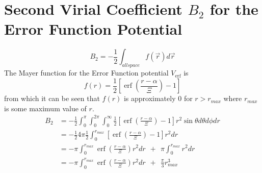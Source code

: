 \documentclass[double,12pt]{beavtex}
\begin{document}
\section{Second Virial Coefficient $B_{2}$ for the Error Function Potential}
\begin{equation}B_2=-\frac{1}{2}\int_{allspace}f(\vec{r})d\vec r\end{equation}
The Mayer function for the Error Function potential $V_{\operatorname{erf}}$ is
\begin{equation}f(r)=\frac{1}{2}\left[\operatorname{erf}\left(\frac{r-\alpha}{\Xi}\right)-1\right]\end{equation} 
from which it can be seen that $f(r)$ is approximately 0 for $r>r_{max}$ 
where $r_{max}$ is some maximum value of $r$.
\begin{align}
 B_2 &= -\frac{1}{2}\int_0^{\pi}\int_0^{2\pi}\int_0^\infty\frac{1}{2}\left[\operatorname{erf}\left(\frac{r-\alpha}{\Xi}\right)-1\right]r^2\sin{\theta}d{\theta}d{\phi}dr \nonumber  \\
     &= -\frac{1}{2}4\pi\frac{1}{2}\int_{0}^{r_{max}}\left[\operatorname{erf}\left(\frac{r-\alpha}{\Xi}\right)-1\right]r^2dr \nonumber  \\
     &= -\pi\int_{0}^{r_{max}}\operatorname{erf}\left(\frac{r-\alpha}{\Xi}\right)r^2dr {~~}+{~~} \pi\int_0^{r_{max}}r^2dr  \nonumber  \\
     &= -\pi\int_{0}^{r_{max}}\operatorname{erf}\left(\frac{r-\alpha}{\Xi}\right)r^2dr {~~}+{~~} \frac{\pi}{3}r_{max}^3   
\end{align}
\end{document}

